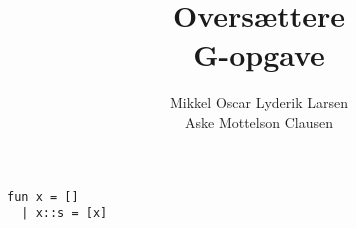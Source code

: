 \documentclass[12pt]{article}
\begin{document}
\author{Mikkel Oscar Lyderik Larsen \\ Aske Mottelson Clausen}
\title{Oversættere \\ G-opgave}
\maketitle

\thispagestyle{empty}
\newpage

\begin{verbatim}
fun x = []
  | x::s = [x]
\end{verbatim}

{}

\end{document}
